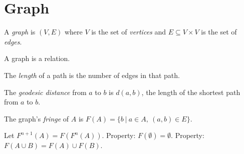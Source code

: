 \chapter{Graph}

A \emph{graph} is \((V,E)\) where
\(V\) is the set of \emph{vertices} and \(E \subseteq V \times V\) is the set of \emph{edges}.

A graph is a relation.

The \emph{length} of a path is the number of edges in that path.

The \emph{geodesic distance} from \(a\) to \(b\) is \(d(a,b)\),
the length of the shortest path from \(a\) to \(b\).

The graph's \emph{fringe} of \(A\) is \(F(A) = \{ b ~|~ a \in A, ~ (a,b) \in E \}\).

Let \(F^{n+1}(A) = F(F^n(A))\).
Property: \(F(\emptyset) = \emptyset\).
Property: \(F(A \cup B) = F(A) \cup F(B)\).
